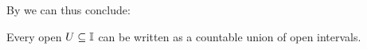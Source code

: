 By  we can thus conclude:
\begin{lemma}\label{IntervalTopologyStandard}
  Every open $U\subseteq \mathbb{I}$ can be written as a countable union of open intervals.
\end{lemma} 

